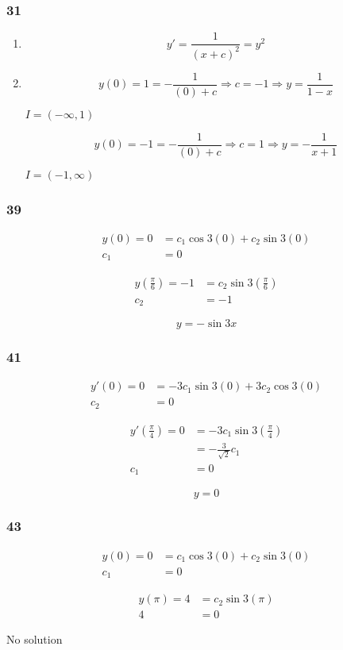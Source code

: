 \documentclass{article}
\begin{document}
\subsubsection{31}

\begin{enumerate}
  \item \[y' = \frac{1}{(x + c)^2} = y^2\]

  \item

        \[y(0) = 1 = -\frac{1}{(0) + c} \Rightarrow c = -1 \Rightarrow y = \frac{1}{1 - x}\]

        $I = (-\infty, 1)$

        \[y(0) = -1 = -\frac{1}{(0) + c} \Rightarrow c = 1 \Rightarrow y = -\frac{1}{x + 1}\]

        $I = (-1, \infty)$
\end{enumerate}

\subsubsection{39}

\begin{align*}
  y(0) = 0 & = c_1 \cos 3 (0) + c_2 \sin 3 (0) \\
  c_1      & = 0
\end{align*}

\begin{align*}
  y \left( \frac{\pi}{6} \right) = -1 & = c_2 \sin 3 \left( \frac{\pi}{6} \right) \\
  c_2                                 & = -1
\end{align*}

\[y = -\sin 3 x\]

\subsubsection{41}

\begin{align*}
  y'(0) = 0 & = -3 c_1 \sin 3 (0) + 3 c_2 \cos 3 (0) \\
  c_2       & = 0
\end{align*}

\begin{align*}
  y' \left( \frac{\pi}{4} \right) = 0 & = -3 c_1 \sin 3 \left( \frac{\pi}{4} \right) \\
                                      & = -\frac{3}{\sqrt{2}} c_1                    \\
  c_1                                 & = 0
\end{align*}

\[y = 0\]

\subsubsection{43}

\begin{align*}
  y(0) = 0 & = c_1 \cos 3 (0) + c_2 \sin 3 (0) \\
  c_1      & = 0
\end{align*}

\begin{align*}
  y(\pi) = 4 & = c_2 \sin 3 (\pi) \\
  4          & = 0
\end{align*}

No solution
\end{document}
